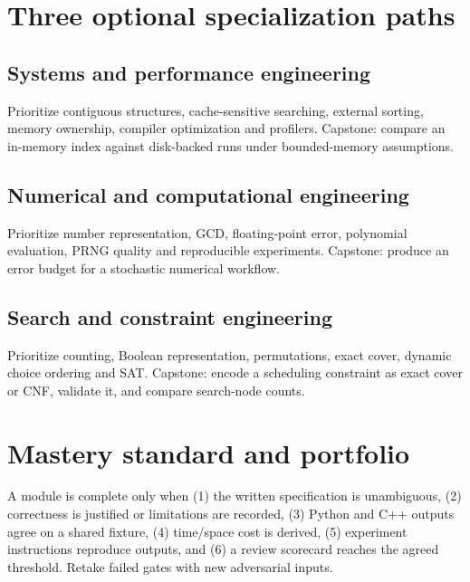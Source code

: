 \documentclass[11pt,letterpaper]{article}
\begin{document}
\section{Three optional specialization paths}
\subsection{Systems and performance engineering}
Prioritize contiguous structures, cache-sensitive searching, external sorting, memory ownership, compiler optimization and profilers. Capstone: compare an in-memory index against disk-backed runs under bounded-memory assumptions.
\subsection{Numerical and computational engineering}
Prioritize number representation, GCD, floating-point error, polynomial evaluation, PRNG quality and reproducible experiments. Capstone: produce an error budget for a stochastic numerical workflow.
\subsection{Search and constraint engineering}
Prioritize counting, Boolean representation, permutations, exact cover, dynamic choice ordering and SAT. Capstone: encode a scheduling constraint as exact cover or CNF, validate it, and compare search-node counts.
\section{Mastery standard and portfolio}
A module is complete only when (1) the written specification is unambiguous, (2) correctness is justified or limitations are recorded, (3) Python and C++ outputs agree on a shared fixture, (4) time/space cost is derived, (5) experiment instructions reproduce outputs, and (6) a review scorecard reaches the agreed threshold. Retake failed gates with new adversarial inputs.
\end{document}
